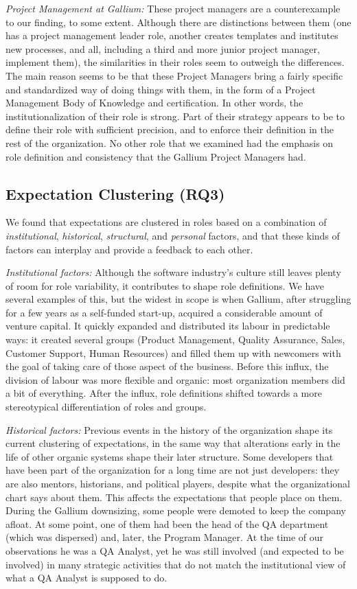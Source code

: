 \documentclass[10pt, conference, compsocconf]{IEEEtran}
\begin{document}
\emph{Project Management at Gallium:} These project managers are a counterexample to our finding, to some extent. Although there are distinctions between them (one has a project management leader role, another creates templates and institutes new processes, and all, including a third and more junior project manager, implement them), the similarities in their roles seem to outweigh the differences. The main reason seems to be that these Project Managers bring a fairly specific and standardized way of doing things with them, in the form of a Project Management Body of Knowledge and certification. In other words, the institutionalization of their role is strong. Part of their strategy appears to be to define their role with sufficient precision, and to enforce their definition in the rest of the organization. No other role that we examined had the emphasis on role definition and consistency that the Gallium Project Managers had.


\subsection{Expectation Clustering (RQ3)}

We found that expectations are clustered in roles based on a combination of \emph{institutional}, \emph{historical}, \emph{structural}, and \emph{personal} factors, and that these kinds of factors can interplay and provide a feedback to each other. 

\emph{Institutional factors:} Although the software industry's culture still leaves plenty of room for role variability, it contributes to shape role definitions. We have several examples of this, but the widest in scope is when Gallium, after struggling for a few years as a self-funded start-up, acquired a considerable amount of venture capital. It quickly expanded and distributed its labour in predictable ways: it created several groups (Product Management, Quality Assurance, Sales, Customer Support, Human Resources) and filled them up with newcomers with the goal of taking care of those aspect of the business. Before this influx, the division of labour was more flexible and organic: most organization members did a bit of everything. After the influx, role definitions shifted towards a more stereotypical differentiation of roles and groups.

\emph{Historical factors:} Previous events in the history of the organization shape its current clustering of expectations, in the same way that alterations early in the life of other organic systems shape their later structure. Some developers that have been part of the organization for a long time are not just developers: they are also mentors, historians, and political players, despite what the organizational chart says about them. This affects the expectations that people place on them. During the Gallium downsizing, some people were demoted to keep the company afloat. At some point, one of them had been the head of the QA department (which was dispersed) and, later, the Program Manager. At the time of our observations he was a QA Analyst, yet he was still involved (and expected to be involved) in many strategic activities that do not match the institutional view of what a QA Analyst is supposed to do.
\end{document}
